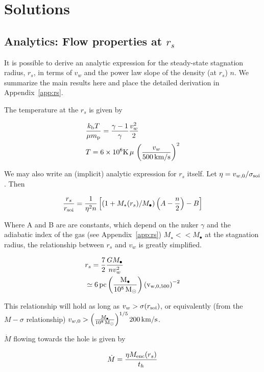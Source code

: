 \documentclass[usenatbib,fleqn]{mn2e}
\newcommand{\Mdot}{\dot{M}}
\newcommand{\rs}{r_s}
\newcommand{\vw}{v_w}
\newcommand{\kew}{\frac{v_w^2}{2}}
\newcommand{\gammafi}{\frac{\gamma-1}{\gamma}}
\newcommand{\kb}{k_{\rm b}}
\renewcommand{\mp}{m_{\rm p}}
\newcommand{\pc}{\rm pc}
\newcommand{\Menc}{M_{\rm enc}}
\newcommand{\Mstar}{M_{\star}}
\newcommand{\Mbh}[1][]{M_{\bullet#1}}
\newcommand{\MbhNorm}{\frac{\Mbh}{10^8 \Msun}}
\newcommand{\soi}{\rm soi}
\newcommand{\rsoi}{r_{\soi}}
\newcommand{\vwO}{v_{w,0}}
\newcommand{\x}{\frac{r_s}{\rsoi}}
\newcommand{\vwOFH}{v_{w,0,500}}
\renewcommand{\th}{t_h}
\begin{document}
\section{Solutions}
\subsection{Analytics: Flow properties at $\rs$}
It is possible to derive an analytic expression for the steady-state stagnation radius, $\rs$, in terms of $v_w$ and the power law slope of the density (at $\rs$) $n$.   We summarize the main results here and place the detailed derivation in Appendix~\ref{app:rs}.

The temperature at the $\rs$ is given by

\begin{align}
 &\frac{\kb T}{\mu \mp}=\gammafi \kew \label{eq:tstag}\\
 &T=6 \times 10^6 {\rm K} \, \mu \, \left({\frac{\vw}{500 \,{\rm km/s}}}\right)^2 
\end{align}

We may also write an (implicit) analytic expression for $\rs$
itself. Let  $\eta=v_{w,0}/\sigma_{\rm soi}$. Then 

\begin{align}
\x=\frac{1}{\eta^2 n}\left[ (1+\Mstar(\rs)/\Mbh)\left(A-\frac{n}{2}\right)-B\right]
\label{eq:stag_analytic}
\end{align}

Where A and B are are constants, which depend on the nuker $\gamma$
and the adiabatic index of the gas (see Appendix~\ref{app:rs})  $\Mstar << \Mbh$ at the stagnation radius, the relationship between $\rs$ and $\vw$ is greatly simplified. 

\begin{align}
&\rs=\frac{7}{2}\frac{G \Mbh}{n \vw^2}\\
&\simeq 6 \, \pc \left(\MbhNorm\right) \left(\vwOFH\right)^{-2}
\label{eq:stag_simple}
\end{align}

This relationship will hold as long as $\vw > \sigma(\rsoi)$, or equivalently (from the $M-\sigma$ relationship) $\vwO > \left(\frac{\Mbh}{10^8 \Msun}\right)^{1/5} 200 {\rm \,  km/s}$.

$\Mdot$ flowing towards the hole is given by

\begin{align}
\dot{M}=\frac{\eta \Menc(\rs)}{\th}
\end{align}
\end{document}
